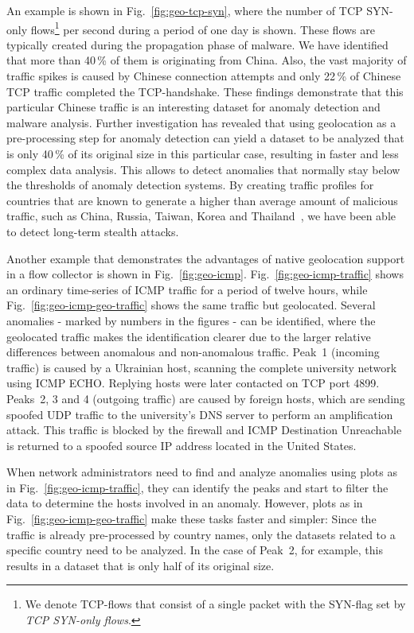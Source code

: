 An example is shown in Fig.~\ref{fig:geo-tcp-syn}, where the number of TCP SYN-only flows\footnote{We denote TCP-flows that consist of a single packet with the SYN-flag set by \textit{TCP SYN-only flows}.} per second during a period of one day is shown. These flows are typically created during the propagation phase of malware. We have identified that more than 40\,\% of them is originating from China. Also, the vast majority of traffic spikes is caused by Chinese connection attempts and only 22\,\% of Chinese TCP traffic completed the TCP-handshake. These findings demonstrate that this particular Chinese traffic is an interesting dataset for anomaly detection and malware analysis. Further investigation has revealed that using geolocation as a pre-processing step for anomaly detection can yield a dataset to be analyzed that is only 40\,\% of its original size in this particular case, resulting in faster and less complex data analysis. This allows to detect anomalies that normally stay below the thresholds of anomaly detection systems. By creating traffic profiles for countries that are known to generate a higher than average amount of malicious traffic, such as China, Russia, Taiwan, Korea and Thailand~\cite{vanPolen-2011-Finding}, we have been able to detect long-term stealth attacks.

Another example that demonstrates the advantages of native geolocation support in a flow collector is shown in Fig.~\ref{fig:geo-icmp}. Fig.~\ref{fig:geo-icmp-traffic} shows an ordinary time-series of ICMP traffic for a period of twelve hours, while Fig.~\ref{fig:geo-icmp-geo-traffic} shows the same traffic but geolocated. Several anomalies - marked by numbers in the figures - can be identified, where the geolocated traffic makes the identification clearer due to the larger relative differences between anomalous and non-anomalous traffic. Peak~1 (incoming traffic) is caused by a Ukrainian host, scanning the complete university network using ICMP ECHO. Replying hosts were later contacted on TCP port 4899. Peaks~2, 3 and 4 (outgoing traffic) are caused by foreign hosts, which are sending spoofed UDP traffic to the university's DNS server to perform an amplification attack. This traffic is blocked by the firewall and ICMP Destination Unreachable is returned to a spoofed source IP address located in the United States.

When network administrators need to find and analyze anomalies using plots as in Fig.~\ref{fig:geo-icmp-traffic}, they can identify the peaks and start to filter the data to determine the hosts involved in an anomaly. However, plots as in Fig.~\ref{fig:geo-icmp-geo-traffic} make these tasks faster and simpler: Since the traffic is already pre-processed by country names, only the datasets related to a specific country need to be analyzed. In the case of Peak~2, for example, this results in a dataset that is only half of its original size.


